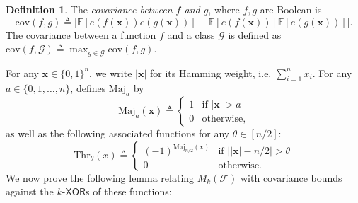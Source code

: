\documentclass[10pt,a4paper]{article}
\theoremstyle{definition}
\newtheorem{definition}[theorem]{Definition}
\begin{document}
\begin{definition}
The \emph{covariance between $f$ and $g$}, where $f,g$ are Boolean is 
\begin{equation*}
    \mathrm{cov}(f,g)\triangleq 
    \bigl| \mathbb{E}[e(f(\mathbf{x}))e(g(\mathbf{x}))] - \mathbb{E}[e(f(\mathbf{x}))]\mathbb{E}[e(g(\mathbf{x}))] \bigr|.
\end{equation*}
The covariance between a function $f$ and a class $\mathcal{G}$ is defined as $\mathrm{cov}(f,\mathcal{G})\triangleq \max_{g\in \mathcal{G}} \mathrm{cov}(f,g)$.
\end{definition}

For any $\mathbf{x}\in \{0,1\}^n$, we write $\vert \mathbf{x}\vert$ for its Hamming weight, i.e. $\sum_{i=1}^n x_i$. For any $a\in \{0,1,\ldots,n\}$, \cite{xorlemma} defines $\mathrm{Maj}_a$ by
\begin{equation*}
    \mathrm{Maj}_a(\mathbf{x})\triangleq \begin{cases}
    1 & \text{if $\vert \mathbf{x}\vert> a$}\\
    0 & \text{otherwise},
    \end{cases}
\end{equation*}
as well as the following associated functions for any $\theta\in [n/2]$:
\begin{equation*}
    \mathrm{Thr}_{\theta}(x)\triangleq \begin{cases}
    (-1)^{\mathrm{Maj}_{n/2}(\mathbf{x})} & \text{if $\big\vert\vert \mathbf{x}\vert-n/2\big\vert> \theta$}\\
    0 & \text{otherwise.}
    \end{cases}
\end{equation*}
We now prove the following lemma relating $M_k(\mathcal{F})$ with covariance bounds against the $k$-$\mathsf{XOR}$s of these functions:
\end{document}
